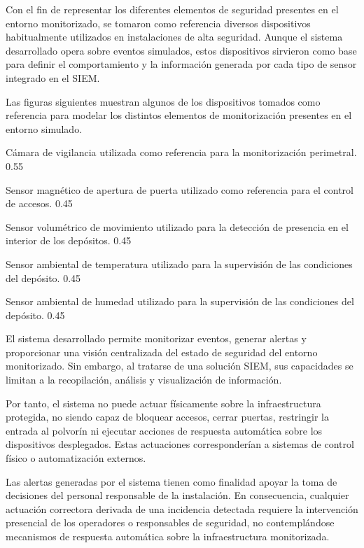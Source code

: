 Con el fin de representar los diferentes elementos de seguridad presentes en el entorno monitorizado, se tomaron como referencia diversos dispositivos habitualmente utilizados en instalaciones de alta seguridad. Aunque el sistema desarrollado opera sobre eventos simulados, estos dispositivos sirvieron como base para definir el comportamiento y la información generada por cada tipo de sensor integrado en el SIEM.

Las figuras siguientes muestran algunos de los dispositivos tomados como referencia para modelar los distintos elementos de monitorización presentes en el entorno simulado.

{Cámara de vigilancia utilizada como referencia para la monitorización perimetral.}
{0.55}

{Sensor magnético de apertura de puerta utilizado como referencia para el control de accesos.}
{0.45}

{Sensor volumétrico de movimiento utilizado para la detección de presencia en el interior de los depósitos.}
{0.45}

{Sensor ambiental de temperatura utilizado para la supervisión de las condiciones del depósito.}
{0.45}

{Sensor ambiental de humedad utilizado para la supervisión de las condiciones del depósito.}
{0.45}

El sistema desarrollado permite monitorizar eventos, generar alertas y proporcionar una visión centralizada del estado de seguridad del entorno monitorizado. Sin embargo, al tratarse de una solución SIEM, sus capacidades se limitan a la recopilación, análisis y visualización de información.

Por tanto, el sistema no puede actuar físicamente sobre la infraestructura protegida, no siendo capaz de bloquear accesos, cerrar puertas, restringir la entrada al polvorín ni ejecutar acciones de respuesta automática sobre los dispositivos desplegados. Estas actuaciones corresponderían a sistemas de control físico o automatización externos.

Las alertas generadas por el sistema tienen como finalidad apoyar la toma de decisiones del personal responsable de la instalación. En consecuencia, cualquier actuación correctora derivada de una incidencia detectada requiere la intervención presencial de los operadores o responsables de seguridad, no contemplándose mecanismos de respuesta automática sobre la infraestructura monitorizada.

